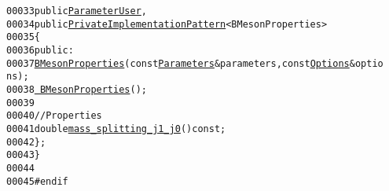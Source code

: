 \begin{footnotesize}
\begin{alltt}
00033         \textcolor{keyword}{public} \hyperlink{classeos_1_1ParameterUser}{ParameterUser},
00034         \textcolor{keyword}{public} \hyperlink{classeos_1_1PrivateImplementationPattern}{PrivateImplementationPattern}<BMesonProperties>
00035     \{
00036         \textcolor{keyword}{public}:
00037             \hyperlink{classeos_1_1BMesonProperties_af127f7490e06b7a175fa3f82a0be7152}{BMesonProperties}(\textcolor{keyword}{const} \hyperlink{classeos_1_1Parameters}{Parameters} & parameters, \textcolor{keyword}{const} \hyperlink{classeos_1_1Options}{Options} & optio
      ns);
00038             \hyperlink{classeos_1_1BMesonProperties_aea9b828528431dfdfe7b13ca1fce9c14}{~BMesonProperties}();
00039 
00040             \textcolor{comment}{// Properties}
00041             \textcolor{keywordtype}{double} \hyperlink{classeos_1_1BMesonProperties_aa79a7d1ef74dacb2c3b393ca9ad18225}{mass_splitting_j1_j0}() \textcolor{keyword}{const};
00042     \};
00043 \}
00044 
00045 \textcolor{preprocessor}{#endif}
\end{alltt}\end{footnotesize}
